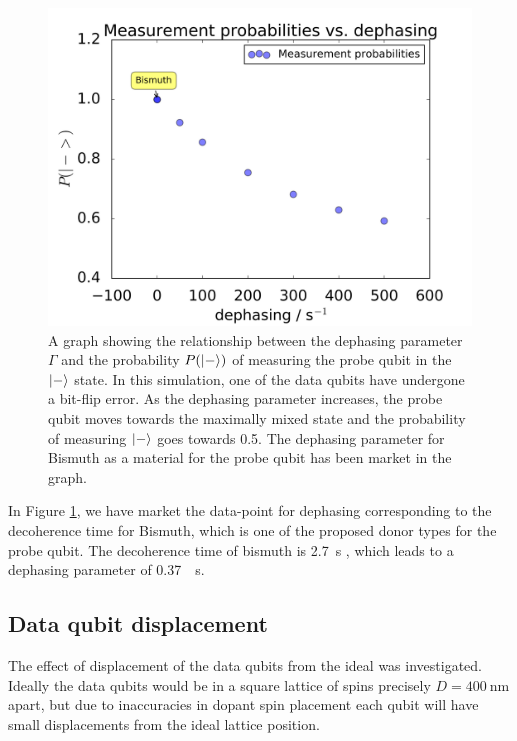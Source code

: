 \begin{figure}[!ht]
	\centering
	\includegraphics[width=\textwidth]{Figures/phase_graph.png}
		\caption{A graph showing the relationship between the dephasing parameter $\Gamma$ and the probability $P(\ket{-})$ of measuring the probe qubit in the $\ket{-}$ state. In this simulation, one of the data qubits have undergone a bit-flip error. As the dephasing parameter increases, the probe qubit moves towards the maximally mixed state and the probability of measuring $\ket{-}$ goes towards 0.5. The dephasing parameter for Bismuth as a material for the probe qubit has been market in the graph.}
		\label{fig:phaseplot}
\end{figure}


In Figure \ref{fig:phaseplot}, we have market the data-point for dephasing corresponding to the decoherence time for Bismuth, which is one of the proposed donor types for the probe qubit. The decoherence time of bismuth is \SI{2.7}{\second} \cite{Wolfowicz2013}, which leads to a dephasing parameter of \SI{0.37}{\per\second}. 


\subsection{Data qubit displacement}
The effect of displacement of the data qubits from the ideal was investigated. Ideally the data qubits would be in a square lattice of spins precisely $D = \SI{400}{\nano\metre}$ apart, but due to inaccuracies in dopant spin placement each qubit will have small displacements from the ideal lattice position.

